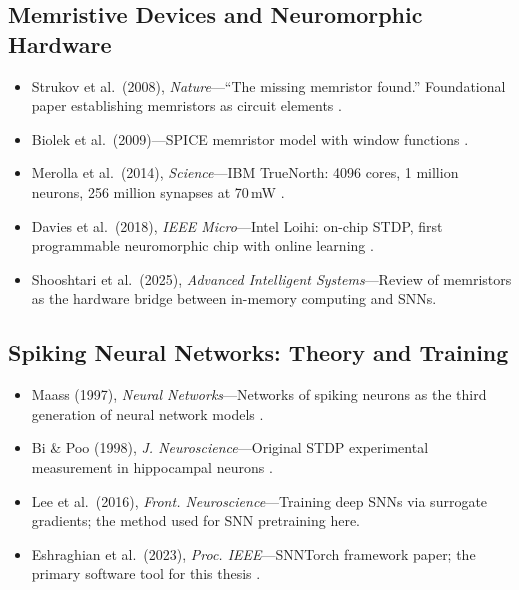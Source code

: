 \documentclass[11pt,a4paper]{article}
\begin{document}
\subsection*{Memristive Devices and Neuromorphic Hardware}
\begin{itemize}[leftmargin=*, itemsep=2pt]
  \item Strukov et al.\ (2008), \textit{Nature}---``The missing memristor found.''
        Foundational paper establishing memristors as circuit elements \cite{strukov2008}.
  \item Biolek et al.\ (2009)---SPICE memristor model with window functions \cite{biolek2009}.
  \item Merolla et al.\ (2014), \textit{Science}---IBM TrueNorth: 4096 cores,
        1 million neurons, 256 million synapses at 70\,mW \cite{merolla2014}.
  \item Davies et al.\ (2018), \textit{IEEE Micro}---Intel Loihi: on-chip STDP,
        first programmable neuromorphic chip with online learning \cite{davies2018}.
  \item Shooshtari et al.\ (2025), \textit{Advanced Intelligent Systems}---Review of
        memristors as the hardware bridge between in-memory computing and SNNs.
\end{itemize}

\subsection*{Spiking Neural Networks: Theory and Training}
\begin{itemize}[leftmargin=*, itemsep=2pt]
  \item Maass (1997), \textit{Neural Networks}---Networks of spiking neurons as the
        third generation of neural network models \cite{maass1997}.
  \item Bi \& Poo (1998), \textit{J. Neuroscience}---Original STDP experimental
        measurement in hippocampal neurons \cite{bi1998}.
  \item Lee et al.\ (2016), \textit{Front. Neuroscience}---Training deep SNNs via
        surrogate gradients; the method used for SNN pretraining here.
  \item Eshraghian et al.\ (2023), \textit{Proc. IEEE}---SNNTorch framework paper;
        the primary software tool for this thesis \cite{eshraghian2023}.
\end{itemize}
\end{document}
